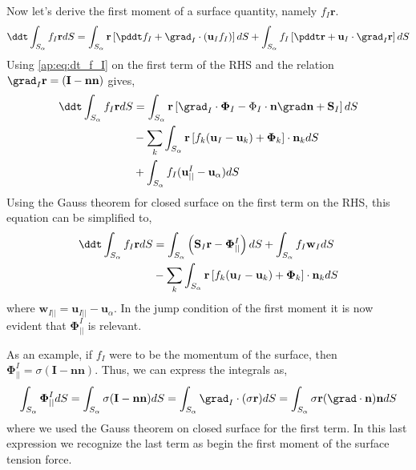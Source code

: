 Now let's derive the first moment of a surface quantity, namely $f_I \textbf{r}$. 
\begin{align*}
    \ddt \int_{S_\alpha} f_I \textbf{r} dS
    &= \int_{S_\alpha} \textbf{r}\left[
        \pddt f_I 
        + \grad_I \cdot (\textbf{u}_If_I) 
    \right]dS
    + \int_{S_\alpha}
    f_I \left[
        \pddt \textbf{r} + \textbf{u}_I \cdot \grad_I \textbf{r}
    \right]
    dS\\
\end{align*}
Using \ref{ap:eq:dt_f_I} on the first term of the RHS and the relation $\grad_I \textbf{r} = (\textbf{I} - \textbf{nn})$ gives, 
\begin{align*}
    \ddt \int_{S_\alpha} f_I \textbf{r} dS
    &= \int_{S_\alpha} \textbf{r}\left[
        \grad_I \cdot \mathbf{\Phi}_I
        - \Phi_I\cdot\textbf{n}\grad\textbf{n}
        + \textbf{S}_I
    \right] dS\\
    & - \sum_k \int_{S_\alpha}\textbf{r} \left[
        f_k (\textbf{u}_I - \textbf{u}_k)
        + \mathbf{\Phi}_k
    \right] \cdot \textbf{n}_k
    dS\\
    &+ \int_{S_\alpha}
    f_I (\textbf{u}^I_{||} - \textbf{u}_\alpha)
    dS\\
\end{align*}
Using the Gauss theorem for closed surface on the first term on the RHS, this equation can be simplified to, 
\begin{align}
    \ddt \int_{S_\alpha} f_I \textbf{r} dS
    &= \int_{S_\alpha} \left(
        \textbf{S}_I\textbf{r}
        - \mathbf{\Phi}_{||}^I
    \right) dS
    + \int_{S_\alpha}
    f_I \textbf{w}_I
    dS\nonumber\\
    & - \sum_k \int_{S_\alpha}\textbf{r} \left[
        f_k (\textbf{u}_I - \textbf{u}_k)
        + \mathbf{\Phi}_k
    \right] \cdot \textbf{n}_k
    dS
    \label{ap:eq:dt_r_f_I}
\end{align}
where $\textbf{w}_{I||} = \textbf{u}_{I||} - \textbf{u}_\alpha$. 
In the jump condition of the first moment it is now evident that $\mathbf{\Phi}^I_{||}$ is relevant. 

As an example, if $f_I$ were to be the momentum of the surface, then $\mathbf{\Phi}_{||}^I = \sigma (\textbf{I} - \textbf{nn})$. 
Thus, we can express the integrals as, 
\begin{equation*}
    \int_{S_\alpha}\mathbf{\Phi}_{||}^IdS
    =\int_{S_\alpha} \sigma (\textbf{I} - \textbf{nn}) dS
    =\int_{S_\alpha} \grad_I \cdot (\sigma \textbf{r}) dS
    =\int_{S_\alpha} \sigma \textbf{r} (\grad\cdot\textbf{n}) \textbf{n} dS
\end{equation*} 
where we used the Gauss theorem on closed surface for the first term. 
In this last expression we recognize the last term as begin the first moment of the surface tension force. 




